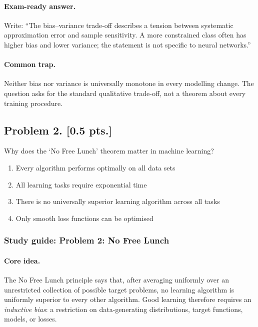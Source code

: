 \documentclass[11pt,a4paper]{article}
\begin{document}
\paragraph{Exam-ready answer.}

Write: ``The bias--variance trade-off describes a tension between systematic approximation error and sample sensitivity. A more constrained class often has higher bias and lower variance; the statement is not specific to neural networks.''

\paragraph{Common trap.}

Neither bias nor variance is universally monotone in every modelling change. The question asks for the standard qualitative trade-off, not a theorem about every training procedure.



\subsection{Problem 2. [0.5 pts.]}
Why does the `No Free Lunch' theorem matter in machine learning?
\begin{enumerate}[label=(\alph*)]
    \item Every algorithm performs optimally on all data sets
    \item All learning tasks require exponential time
    \item There is no universally superior learning algorithm across all tasks
    \item Only smooth loss functions can be optimised
\end{enumerate}


\subsubsection{Study guide: Problem 2: No Free Lunch}

\paragraph{Core idea.}

The No Free Lunch principle says that, after averaging uniformly over an unrestricted collection of possible target problems, no learning algorithm is uniformly superior to every other algorithm. Good learning therefore requires an \emph{inductive bias}: a restriction on data-generating distributions, target functions, models, or losses.
\end{document}
